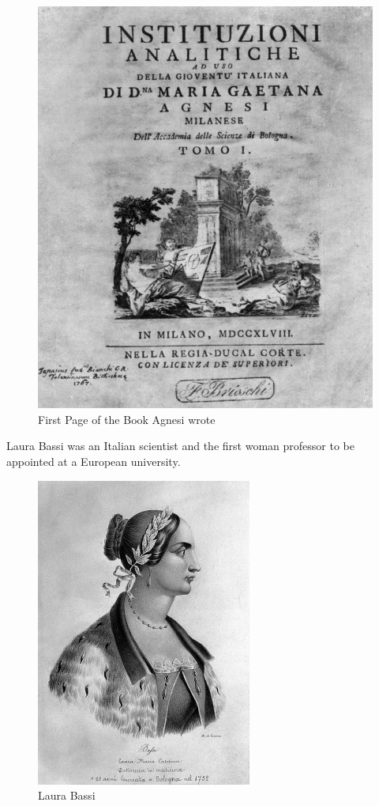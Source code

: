 \documentclass[a4paper,10pt]{article}
\begin{document}
\begin{center}
\begin{figure}[h]
\centering
 \includegraphics[scale=0.9]{agnesi.png}
 \caption{First Page of the Book Agnesi wrote}
\end{figure}
\end{center}

\newblock
Laura Bassi was an Italian scientist and the first woman professor to be appointed at a European university\cite{laura}.

\begin{center}
\begin{figure}[h]
\centering
 \includegraphics[scale=0.9]{laura.png}
 \caption{Laura Bassi}
\end{figure}
\end{center}
\end{document}
